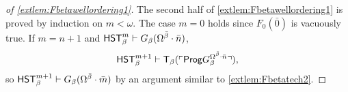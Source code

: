 \documentclass[UKenglish,cleveref,DIV=12]{scrartcl}
\let\forall\forallAlt
\theoremstyle{definition}
\theoremstyle{definition}
\begin{document}
\begin{proof}[of \cref{extlem:Fbetawellordering1}]
The second half of \cref{extlem:Fbetawellordering1} is proved by induction on $m<\omega$. The case $m=0$ holds since $F_0(\bar0)$ is vacuously true. If $m=n+1$ and $\mathsf{HST}_\beta^m\vdash G_\beta(\Omega^{\bar\beta}\cdot\bar n)$,
\begin{align*}
 \mathsf{HST}_\beta^{m+1}\vdash \mathsf{T}_\beta(\ulcorner{\mathsf{Prog}G_\beta^{\Omega^{\bar\beta}\cdot\bar n}}\urcorner),
\end{align*}
so $\mathsf{HST}_\beta^{m+1}\vdash G_\beta(\Omega^{\bar\beta}\cdot\bar m)$ by an argument similar to \cref{extlem:Fbetatech2}.
%
%
%
%
%

\end{proof}
\end{document}

